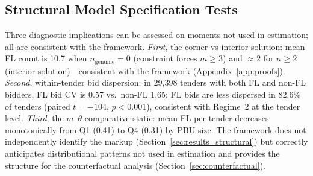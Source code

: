 
\subsection{Structural Model Specification Tests}
\label{sec:spec_tests}

Three diagnostic implications can be assessed on moments not used in estimation; all are consistent with the framework.
\emph{First}, the corner-vs-interior solution: mean FL count is 10.7
when $n_{\text{genuine}} = 0$ (constraint forces $m \geq 3$) and
$\approx 2$ for $n \geq 2$ (interior solution)---consistent with
the framework (Appendix~\ref{app:proofs}).
\emph{Second}, within-tender bid dispersion: in 29,398 tenders with
both FL and non-FL bidders, FL bid CV is 0.57 vs.\ non-FL 1.65; FL
bids are less dispersed in 82.6\% of tenders (paired $t = -104$,
$p < 0.001$), consistent with Regime~2 at the tender level.
\emph{Third}, the $m$--$\theta$ comparative static: mean FL per tender
decreases monotonically from Q1 (0.41) to Q4 (0.31) by PBU size.
The framework does not independently identify the markup
(Section~\ref{sec:results_structural}) but correctly anticipates
distributional patterns not used in estimation and provides the
structure for the counterfactual analysis
(Section~\ref{sec:counterfactual}).
